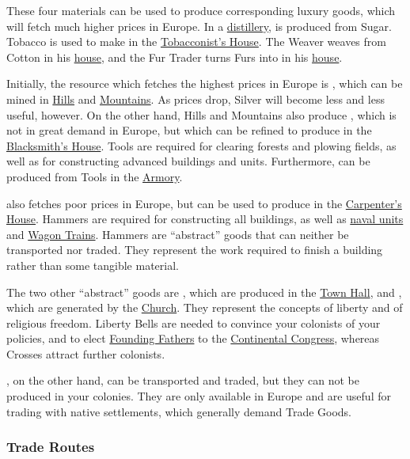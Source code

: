 \documentclass[12pt]{article}
\begin{document}
These four materials can be used to produce corresponding luxury
goods, which will fetch much higher prices in Europe. In a
\hyperlink{Distiller's House}{distillery},  is produced
from Sugar. Tobacco is used to make  in the
\hyperlink{Tobacconist's House}{Tobacconist's House}. The Weaver
weaves  from Cotton in his \hyperlink{Weaver's
House}{house}, and the Fur Trader turns Furs into  in his
\hyperlink{Fur Trader's House}{house}.

Initially, the resource which fetches the highest prices in Europe is
, which can be mined in \hyperlink{Hills}{Hills} and
\hyperlink{Mountains}{Mountains}. As prices drop, Silver will become
less and less useful, however. On the other hand, Hills and Mountains
also produce , which is not in great demand in Europe, but
which can be refined to produce  in the
\hyperlink{Blacksmith's House}{Blacksmith's House}. Tools are required
for clearing forests and plowing fields, as well as for constructing
advanced buildings and units. Furthermore,  can be
produced from Tools in the \hyperlink{Armory}{Armory}.

 also fetches poor prices in Europe, but can be used to
produce  in the \hyperlink{Carpenter's
House}{Carpenter's House}. Hammers are required for constructing all
buildings, as well as \hyperlink{Naval Units}{naval units} and
\hyperlink{Wagon Train}{Wagon Trains}. Hammers are ``abstract'' goods
that can neither be transported nor traded. They represent the work
required to finish a building rather than some tangible material.

The two other ``abstract'' goods are , which are
produced in the \hyperlink{Town Hall}{Town Hall}, and ,
which are generated by the \hyperlink{Church}{Church}. They represent
the concepts of liberty and of religious freedom. Liberty Bells are
needed to convince your colonists of your policies, and to elect
\hyperlink{Founding Fathers}{Founding Fathers} to the
\hyperlink{Continental Congress}{Continental Congress}, whereas
Crosses attract further colonists.

, on the other hand, can be transported and traded,
but they can not be produced in your colonies. They are only available
in Europe and are useful for trading with native settlements, which
generally demand Trade Goods.


\hypertarget{Trade Routes}{\subsubsection{Trade Routes}}
\end{document}
